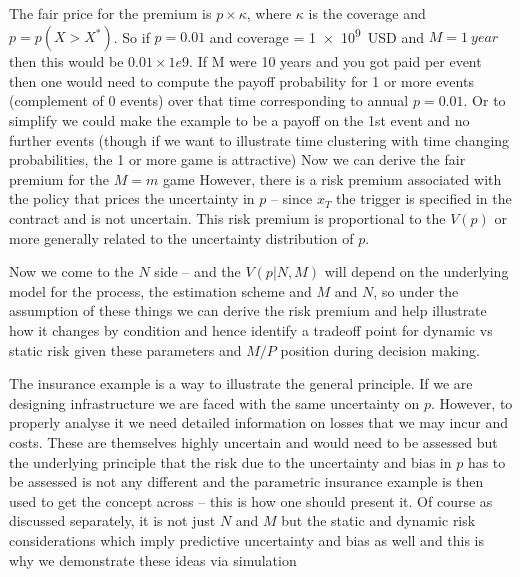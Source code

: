 \documentclass[11pt]{article}
\begin{document}
The fair price for the premium is $p \times \kappa$, where $\kappa$ is the coverage and $p = p(X > X^*)$.
So if $p=0.01$ and coverage = \SI{1e9}{USD} and $M=\SI{1}{year}$ then this would be $0.01 \times 1e9$.
If M were 10 years and you got paid per event then one would need to compute the payoff probability for 1 or more events  (complement of 0 events) over that time corresponding to annual $p=0.01$.
Or to simplify we could make the example to be a payoff on the 1st event and no further events (though if we want to illustrate time clustering with time changing probabilities, the 1 or more game is attractive)
Now we can derive the fair premium for the $M=m$ game
However, there is a risk premium associated with the policy that prices the uncertainty in $p$ -- since $x_T$ the trigger is specified in the contract and is not uncertain. This risk premium is proportional to the $V(p)$ or more generally related to the uncertainty distribution of $p$.

Now we come to the $N$ side -- and the $V(p \big| N, M)$ will depend on the underlying model for the process, the estimation scheme and $M$ and $N$, so under the assumption of these things we can derive the risk premium and help illustrate how it changes by condition and hence identify a tradeoff point for dynamic vs static risk given these parameters and $M/P$ position during decision making.

The insurance example is a way to illustrate the general principle.
If we are designing infrastructure we are faced with the same uncertainty on $p$.
However, to properly analyse it we need detailed information on losses that we may incur and costs.
These are themselves highly uncertain and would need to be assessed but the underlying principle that the risk due to the uncertainty and bias in $p$ has to be assessed is not any different and the parametric insurance example is then used to get the concept across -- this is how one should present it.
Of course as discussed separately, it is not just $N$ and $M$ but the static and dynamic risk considerations which imply predictive uncertainty and bias as well and this is why we demonstrate these ideas via simulation
\end{document}
